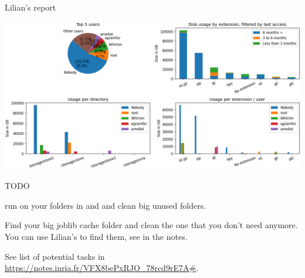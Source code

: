 \documentclass{beamer}
\begin{document}
    \begin{frame}{Lilian's report}

        {\centering
        \includegraphics[width=\textwidth]{storage.png}
        }

    \end{frame}

    \begin{frame}{TODO}

        \myitem{} \parbox[t]{.9\textwidth}{run  on your  folders in  and  and clean big unused folders.\\[1em]}

        \myitem \parbox[t]{.9\textwidth}{Find your big joblib cache folder and clean the one that you don't need anymore.\\
        You can use Lilian's  to find them, see in the notes.\\[1em]}

        \myitem{} See list of potential tasks in \\{\centering \url{https://notes.inria.fr/VFX8bePxRJO\_78rcd9rE7A\#}.\\[1em]}


    \end{frame}
\end{document}

